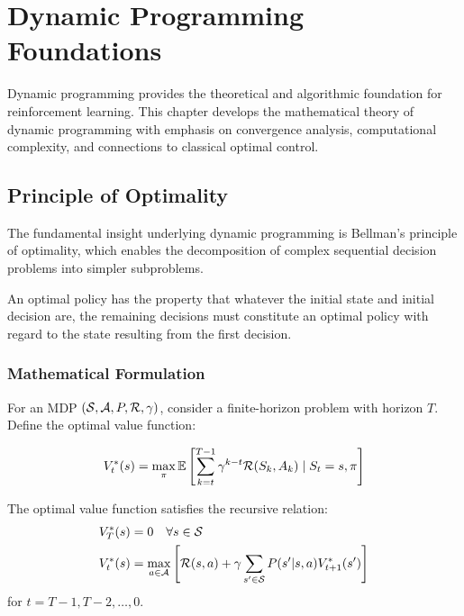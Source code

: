 \chapter{Dynamic Programming Foundations}
\label{ch:dynamic-programming}

Dynamic programming provides the theoretical and algorithmic foundation for reinforcement learning. This chapter develops the mathematical theory of dynamic programming with emphasis on convergence analysis, computational complexity, and connections to classical optimal control.

\section{Principle of Optimality}

The fundamental insight underlying dynamic programming is Bellman's principle of optimality, which enables the decomposition of complex sequential decision problems into simpler subproblems.

\begin{theorem}
An optimal policy has the property that whatever the initial state and initial decision are, the remaining decisions must constitute an optimal policy with regard to the state resulting from the first decision.
\end{theorem}

\subsection{Mathematical Formulation}

For an MDP $(\mathcal{S}, \mathcal{A}, P, \mathcal{R}, \gamma)$, consider a finite-horizon problem with horizon $T$. Define the optimal value function:

\begin{equation}
V_t^*(s) = \max_{\pi} \mathbb{E}\left[\sum_{k=t}^{T-1} \gamma^{k-t} \mathcal{R}(S_k, A_k) \mid S_t = s, \pi\right]
\end{equation}

\begin{theorem}
The optimal value function satisfies the recursive relation:
\begin{align}
V_T^*(s) &= 0 \quad \forall s \in \mathcal{S} \\
V_t^*(s) &= \max_{a \in \mathcal{A}} \left[\mathcal{R}(s,a) + \gamma \sum_{s' \in \mathcal{S}} P(s'|s,a) V_{t+1}^*(s')\right]
\end{align}
for $t = T-1, T-2, \ldots, 0$.
\end{theorem}

